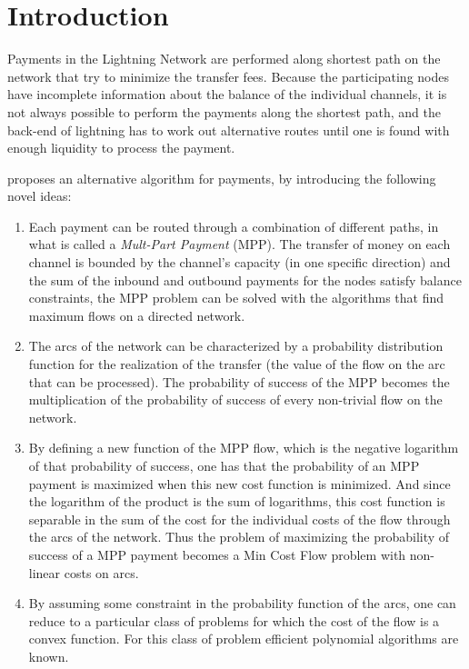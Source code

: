 \section{Introduction}

Payments in the Lightning Network are performed along shortest path on the
network that try to minimize the transfer fees.
Because the participating nodes have incomplete information about the balance of
the individual channels, it is not always possible to perform the payments along
the shortest path, and the back-end of lightning has to work out alternative
routes until one is found with enough liquidity to process the payment.

\cite{pickhardt21} proposes an alternative algorithm for payments, by
introducing the following novel ideas:
\begin{enumerate}
    \item Each payment can be routed through a combination of different paths,
    in what is called a \emph{Mult-Part Payment} (MPP).
    The transfer of money on each channel is bounded by the channel's capacity
    (in one specific direction) and the sum of the inbound and outbound payments
    for the nodes satisfy balance constraints, the MPP problem can be solved
    with the algorithms that find maximum flows on a directed network.
    \item The arcs of the network can be characterized by a probability
    distribution function for the realization of the transfer (the value of the
    flow on the arc that can be processed).
    The probability of success of the MPP becomes the multiplication of the
    probability of success of every non-trivial flow on the network.
    \item By defining a new function of the MPP flow,
    which is the negative logarithm of that probability of success,
    one has that the probability of an MPP payment is maximized when this new
    cost function is minimized. And since the logarithm of the product is the
    sum of logarithms, this cost function is separable in the sum of the cost
    for the individual costs of the flow through the arcs of the network.
    Thus the problem of maximizing the probability of success of a MPP payment
    becomes a Min Cost Flow problem with non-linear costs on arcs.
    \item By assuming some constraint in the probability function of the arcs,
    one can reduce to a particular class of problems for which the cost of the
    flow is a convex function. For this class of problem efficient polynomial
    algorithms are known.
\end{enumerate}
